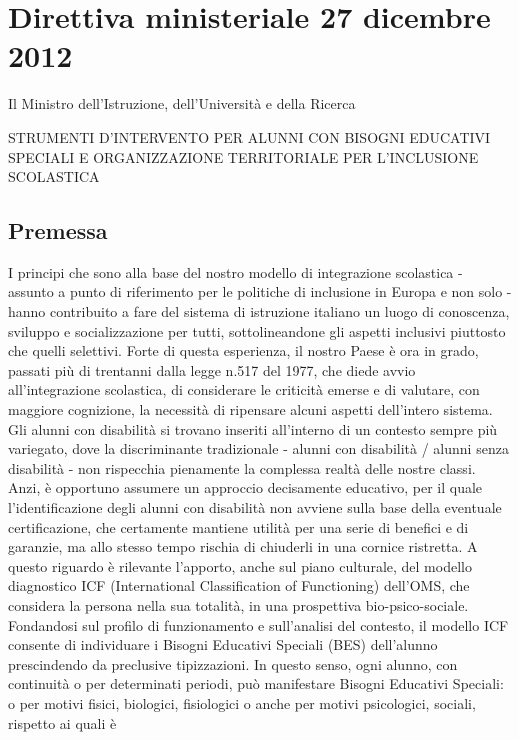 \chapter{Direttiva ministeriale 27 dicembre 2012}
\label{cha:Direttivaministeriale27dicembre2012}
\begin{center}
Il Ministro dell'Istruzione, dell'Università e della Ricerca

STRUMENTI D'INTERVENTO PER ALUNNI CON BISOGNI EDUCATIVI SPECIALI
E ORGANIZZAZIONE TERRITORIALE PER L'INCLUSIONE SCOLASTICA
\end{center}
\section*{Premessa}
I principi che sono alla base del nostro modello di integrazione scolastica - assunto a punto di riferimento per
le politiche di inclusione in Europa e non solo - hanno contribuito a fare del sistema di istruzione italiano un
luogo di conoscenza, sviluppo e socializzazione per tutti, sottolineandone gli aspetti inclusivi piuttosto che
quelli selettivi.
Forte di questa esperienza, il nostro Paese è ora in grado, passati più di trentanni dalla legge n.517 del 1977,
che diede avvio all'integrazione scolastica, di considerare le criticità emerse e di valutare, con maggiore
cognizione, la necessità di ripensare alcuni aspetti dell'intero sistema.
Gli alunni con disabilità si trovano inseriti all'interno di un contesto sempre più variegato, dove la
discriminante tradizionale - alunni con disabilità / alunni senza disabilità - non rispecchia pienamente la
complessa realtà delle nostre classi. Anzi, è opportuno assumere un approccio decisamente educativo, per il
quale l'identificazione degli alunni con disabilità non avviene sulla base della eventuale certificazione, che
certamente mantiene utilità per una serie di benefici e di garanzie, ma allo stesso tempo rischia di chiuderli in
una cornice ristretta. A questo riguardo è rilevante l'apporto, anche sul piano culturale, del modello
diagnostico ICF (International Classification of Functioning) dell'OMS, che considera la persona nella sua
totalità, in una prospettiva bio-psico-sociale. Fondandosi sul profilo di funzionamento e sull'analisi del
contesto, il modello ICF consente di individuare i Bisogni Educativi Speciali (BES) dell'alunno
prescindendo da preclusive tipizzazioni.
In questo senso, ogni alunno, con continuità o per determinati periodi, può manifestare Bisogni Educativi
Speciali: o per motivi fisici, biologici, fisiologici o anche per motivi psicologici, sociali, rispetto ai quali è
